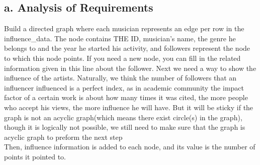 \documentclass[UTF-8]{article}
\begin{document}
    \subsection{a. Analysis of Requirements}
    Build a directed graph where each musician represents an edge per row in the influence\_data. The node contains THE ID, musician's name, the genre he belongs to and the year 
    he started his activity, and followers represent the node to which this node points. 
    If you need a new node, you can fill in the related information given in this line about the follower.
    Next we need a way to show the influence of the artists. Naturally, we think the number of followers that an influencer influenced is a perfect index, as in academic community
    the impact factor of a certain work is about how many times it was cited, the more people who accept his views, the more influence he will have. But it will be sticky 
    if the graph is not an acyclic graph(which means there exist circle(s) in the graph), though it is  logically not possible, we still need to make sure that 
   the graph is acyclic graph to preform the next step\\
    Then, influence information is added to each node, and its value is the number of points it pointed to.
    
\end{document}
